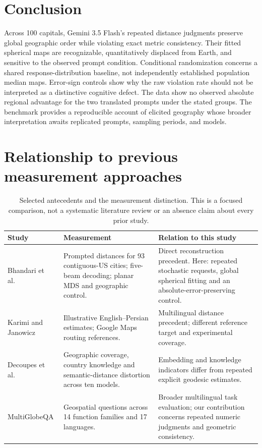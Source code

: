 \documentclass[12pt,a4paper]{article}
\begin{document}
\section{Conclusion}
Across 100 capitals, Gemini 3.5 Flash's repeated distance judgments preserve global geographic order while violating exact metric consistency. Their fitted spherical maps are recognizable, quantitatively displaced from Earth, and sensitive to the observed prompt condition. Conditional randomization concerns a shared response-distribution baseline, not independently established population median maps. Error-sign controls show why the raw violation rate should not be interpreted as a distinctive cognitive defect. The data show no observed absolute regional advantage for the two translated prompts under the stated groups. The benchmark provides a reproducible account of elicited geography whose broader interpretation awaits replicated prompts, sampling periods, and models.



\clearpage
\appendix

\section{Relationship to previous measurement approaches}\label{app:prior}
\begin{table}[htbp]\centering\small
\caption{Selected antecedents and the measurement distinction. This is a focused comparison, not a systematic literature review or an absence claim about every prior study.}
\begin{tabular}{p{3.2cm}p{5.0cm}p{6.0cm}}\toprule Study & Measurement & Relation to this study \\\midrule
Bhandari et al.\ \cite{bhandari} & Prompted distances for 93 contiguous-US cities; five-beam decoding; planar MDS and geographic control. & Direct reconstruction precedent. Here: repeated stochastic requests, global spherical fitting and an absolute-error-preserving control. \\
Karimi and Janowicz \cite{karimi} & Illustrative English--Persian estimates; Google Maps routing references. & Multilingual distance precedent; different reference target and experimental coverage. \\
Decoupes et al.\ \cite{decoupes} & Geographic coverage, country knowledge and semantic-distance distortion across ten models. & Embedding and knowledge indicators differ from repeated explicit geodesic estimates. \\
MultiGlobeQA \cite{multiglobe} & Geospatial questions across 14 function families and 17 languages. & Broader multilingual task evaluation; our contribution concerns repeated numeric judgments and geometric consistency. \\
\bottomrule\end{tabular}
\end{table}
\end{document}
